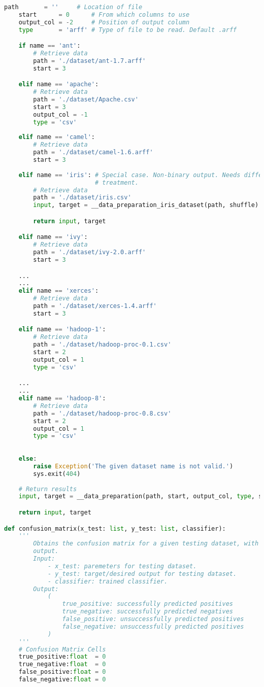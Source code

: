 \begin{lstlisting}[language=Python, caption={Load datasets, calculate metrics, 
export results to CSV files, etc.}, label={lst:data}]
    path       = ''     # Location of file
    start      = 0      # From which columns to use
    output_col = -2     # Position of output column
    type       = 'arff' # Type of file to be read. Default .arff

    if name == 'ant':
        # Retrieve data
        path = './dataset/ant-1.7.arff'
        start = 3

    elif name == 'apache':
        # Retrieve data
        path = './dataset/Apache.csv'
        start = 3
        output_col = -1
        type = 'csv'
        
    elif name == 'camel':
        # Retrieve data
        path = './dataset/camel-1.6.arff'
        start = 3
        
    elif name == 'iris': # Special case. Non-binary output. Needs different 
                         # treatment.
        # Retrieve data
        path = './dataset/iris.csv'
        input, target = __data_preparation_iris_dataset(path, shuffle)

        return input, target

    elif name == 'ivy':
        # Retrieve data
        path = './dataset/ivy-2.0.arff'
        start = 3

    ...
    ...
    elif name == 'xerces':
        # Retrieve data
        path = './dataset/xerces-1.4.arff'
        start = 3

    elif name == 'hadoop-1':
        # Retrieve data
        path = './dataset/hadoop-proc-0.1.csv'
        start = 2
        output_col = 1
        type = 'csv'

    ...
    ...
    elif name == 'hadoop-8':
        # Retrieve data
        path = './dataset/hadoop-proc-0.8.csv'
        start = 2
        output_col = 1
        type = 'csv'
    
    
    else:
        raise Exception('The given dataset name is not valid.') 
        sys.exit(404)
    
    # Return results
    input, target = __data_preparation(path, start, output_col, type, shuffle)

    return input, target

def confusion_matrix(x_test: list, y_test: list, classifier):
    '''
        Obtains the confusion matrix for a given testing dataset, with binary
        output.
        Input:
            - x_test: paremeters for testing dataset.
            - y_test: target/desired output for testing dataset.
            - classifier: trained classifier.
        Output:
            (
                true_positive: successfully predicted positives
                true_negative: successfully predicted negatives
                false_positive: unsuccessfully predicted positives
                false_negative: unsuccessfully predicted positives
            )
    '''
    # Confusion Matrix Cells
    true_positive:float  = 0
    true_negative:float  = 0
    false_positive:float = 0
    false_negative:float = 0


\end{lstlisting}
